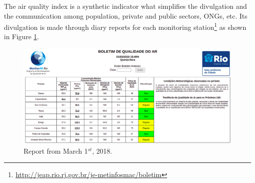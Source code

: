 The air quality index is a synthetic indicator what simplifies the divulgation
and the communication among population, private and public sectors, ONGs, etc.
Its divulgation is made through diary reports for each monitoring
station\footnote{\url{http://jeap.rio.rj.gov.br/je-metinfosmac/boletim}} as
shown in Figure \ref{fig:boletim}. 


\begin{figure}[!ht]  
    \includegraphics[width=\linewidth]{../images/boletim01-03-2018.png}
    \caption{Report from March 1$^{st}$, 2018.}
    \label{fig:boletim}
\end{figure}



